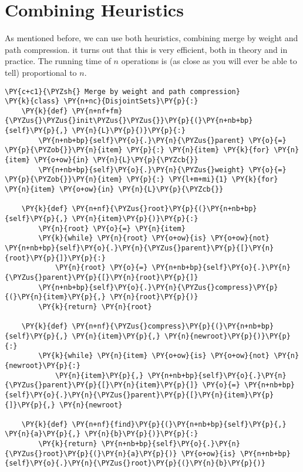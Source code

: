 \section{Combining Heuristics}


As mentioned before, we can use both heuristics, combining merge by weight and path compression.  it turns out that this is very efficient, both in theory and in practice.  The running time of $n$ operations is (as close as you will ever be able to tell) proportional to $n$.

\begin{Verbatim}[commandchars=\\\{\}]
\PY{c+c1}{\PYZsh{} Merge by weight and path compression}
\PY{k}{class} \PY{n+nc}{DisjointSets}\PY{p}{:}
    \PY{k}{def} \PY{n+nf+fm}{\PYZus{}\PYZus{}init\PYZus{}\PYZus{}}\PY{p}{(}\PY{n+nb+bp}{self}\PY{p}{,} \PY{n}{L}\PY{p}{)}\PY{p}{:}
        \PY{n+nb+bp}{self}\PY{o}{.}\PY{n}{\PYZus{}parent} \PY{o}{=} \PY{p}{\PYZob{}}\PY{n}{item} \PY{p}{:} \PY{n}{item} \PY{k}{for} \PY{n}{item} \PY{o+ow}{in} \PY{n}{L}\PY{p}{\PYZcb{}}
        \PY{n+nb+bp}{self}\PY{o}{.}\PY{n}{\PYZus{}weight} \PY{o}{=} \PY{p}{\PYZob{}}\PY{n}{item} \PY{p}{:} \PY{l+m+mi}{1} \PY{k}{for} \PY{n}{item} \PY{o+ow}{in} \PY{n}{L}\PY{p}{\PYZcb{}}

    \PY{k}{def} \PY{n+nf}{\PYZus{}root}\PY{p}{(}\PY{n+nb+bp}{self}\PY{p}{,} \PY{n}{item}\PY{p}{)}\PY{p}{:}
        \PY{n}{root} \PY{o}{=} \PY{n}{item}
        \PY{k}{while} \PY{n}{root} \PY{o+ow}{is} \PY{o+ow}{not} \PY{n+nb+bp}{self}\PY{o}{.}\PY{n}{\PYZus{}parent}\PY{p}{[}\PY{n}{root}\PY{p}{]}\PY{p}{:}
            \PY{n}{root} \PY{o}{=} \PY{n+nb+bp}{self}\PY{o}{.}\PY{n}{\PYZus{}parent}\PY{p}{[}\PY{n}{root}\PY{p}{]}
        \PY{n+nb+bp}{self}\PY{o}{.}\PY{n}{\PYZus{}compress}\PY{p}{(}\PY{n}{item}\PY{p}{,} \PY{n}{root}\PY{p}{)}
        \PY{k}{return} \PY{n}{root}

    \PY{k}{def} \PY{n+nf}{\PYZus{}compress}\PY{p}{(}\PY{n+nb+bp}{self}\PY{p}{,} \PY{n}{item}\PY{p}{,} \PY{n}{newroot}\PY{p}{)}\PY{p}{:}
        \PY{k}{while} \PY{n}{item} \PY{o+ow}{is} \PY{o+ow}{not} \PY{n}{newroot}\PY{p}{:}
            \PY{n}{item}\PY{p}{,} \PY{n+nb+bp}{self}\PY{o}{.}\PY{n}{\PYZus{}parent}\PY{p}{[}\PY{n}{item}\PY{p}{]} \PY{o}{=} \PY{n+nb+bp}{self}\PY{o}{.}\PY{n}{\PYZus{}parent}\PY{p}{[}\PY{n}{item}\PY{p}{]}\PY{p}{,} \PY{n}{newroot}

    \PY{k}{def} \PY{n+nf}{find}\PY{p}{(}\PY{n+nb+bp}{self}\PY{p}{,} \PY{n}{a}\PY{p}{,} \PY{n}{b}\PY{p}{)}\PY{p}{:}
        \PY{k}{return} \PY{n+nb+bp}{self}\PY{o}{.}\PY{n}{\PYZus{}root}\PY{p}{(}\PY{n}{a}\PY{p}{)} \PY{o+ow}{is} \PY{n+nb+bp}{self}\PY{o}{.}\PY{n}{\PYZus{}root}\PY{p}{(}\PY{n}{b}\PY{p}{)}


\end{Verbatim}
